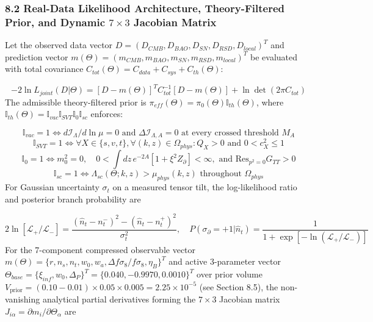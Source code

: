 \documentclass[aps,prd,onecolumn,superscriptaddress,nofootinbib,longbibliography,10pt]{revtex4-2}
\begin{document}
{{  
\subsubsection*{8.2 Real-Data Likelihood Architecture, Theory-Filtered Prior, and Dynamic \(7 \times 3\) Jacobian Matrix}

  Let the observed data vector \(D = (D_{CMB}, D_{BAO}, D_{SN}, D_{RSD}, D_{local})^T\) and prediction vector \(m(\Theta) = (m_{CMB}, m_{BAO}, m_{SN}, m_{RSD}, m_{local})^T\) be evaluated with total covariance \(C_{tot}(\Theta) = C_{data} + C_{sys} + C_{th}(\Theta)\):


  \[ -2\ln L_{joint}(D|\Theta) = [D - m(\Theta)]^T C_{tot}^{-1} [D - m(\Theta)] + \ln\det(2\pi C_{tot}) \]
  The admissible theory-filtered prior is \(\pi_{eff}(\Theta) = \pi_0(\Theta)\mathbb{I}_{th}(\Theta)\), where \(\mathbb{I}_{th}(\Theta) = \mathbb{I}_{vac}\mathbb{I}_{SVT}\mathbb{I}_0\mathbb{I}_{sc}\) enforces:


  \[ \mathbb{I}_{vac} = 1 \iff d\mathcal{I}_\Lambda/d\ln\mu = 0\text{ and }\Delta\mathcal{I}_{\Lambda,A} = 0\text{ at every crossed threshold }M_A \]
  \[ \mathbb{I}_{SVT} = 1 \iff \forall X \in \{s, v, t\}, \forall(k,z) \in \Omega_{phys} : Q_X > 0\text{ and }0 < c_X^2 \le 1 \]
  \[ \mathbb{I}_0 = 1 \iff m_0^2 = 0, \quad 0 < \int dz\,e^{-2A}[1 + \xi^2 Z_\partial] < \infty, \text{ and }\text{Res}_{p^2=0}G_{TT} > 0 \]
  \[ \mathbb{I}_{sc} = 1 \iff \Lambda_{sc}(\Theta; k, z) > \mu_{phys}(k,z)\text{ throughout }\Omega_{phys} \]
  For Gaussian uncertainty \(\sigma_t\) on a measured tensor tilt, the log-likelihood ratio and posterior branch probability are


  \[ 2\ln[\mathcal{L}_+/\mathcal{L}_-] = \frac{(\hat{n}_t - n_t^-)^2 - (\hat{n}_t - n_t^+)^2}{\sigma_t^2}, \quad P(\sigma_\partial = +1|\hat{n}_t) = \frac{1}{1 + \exp[-\ln(\mathcal{L}_+/\mathcal{L}_-)]} \]
  For the 7-component compressed observable vector \(m(\Theta) = \{r, n_s, n_t, w_0, w_a, \Delta f\sigma_8/f\sigma_8, \eta_B\}^T\) and active 3-parameter vector \(\Theta_{base} = \{\xi_{inf}, w_0, \Delta_P\}^T = \{0.040, -0.9970, 0.0010\}^T\) over prior volume \(V_{\text{prior}} = (0.10 - 0.01) \times 0.05 \times 0.005 = 2.25 \times 10^{-5}\) (see Section 8.5), the non-vanishing analytical partial derivatives forming the \(7 \times 3\) Jacobian matrix \(J_{i\alpha} = \partial m_i/\partial\Theta_\alpha\) are



}}
\end{document}
